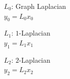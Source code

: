 \documentclass[landscape,a0paper,blockverticalspace = 5mm]{tikzposter}
\begin{document}
\begin{columns}
{{\begin{center}
  \begin{minipage}{0.2\linewidth}
    \begin{center}
      $L_0$: Graph Laplacian\\
      $y_0=L_0x_0$
	\end{center}
  \end{minipage}
  \hspace{4.5cm}
  \begin{minipage}{0.2\linewidth}
    \begin{center}
      $L_1$: $1$-Laplacian\\
      $y_1=L_1x_1$
    \end{center}
  \end{minipage}
  \hspace{4.5cm}
  \begin{minipage}{0.2\linewidth}
    \begin{center}
      $L_2$: $2$-Laplacian\\
      $y_2=L_2x_2$
    \end{center}
  \end{minipage}
\end{center}

}}
\end{columns}
\end{document}

